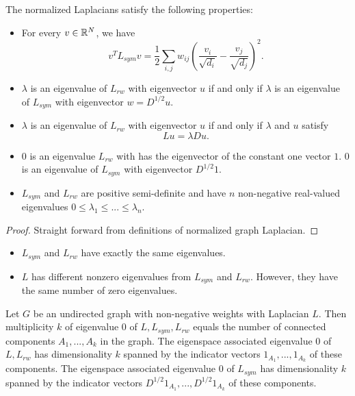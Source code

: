 \begin{refsection}
\begin{theorem}\label{ch:linearalgebra:th:spectrumnormalizedgraphLaplacian}
	The normalized Laplacians satisfy the following properties:
	\begin{itemize}
		\item For every $v\in \mathbb{R}^N$, we have
		$$v^TL_{sym}v = \frac{1}{2}\sum_{i,j} w_{ij}(\frac{v_i}{\sqrt{d_i}}-\frac{v_j}{\sqrt{d_j}})^2.$$
		\item $\lambda$ is an eigenvalue of $L_{rw}$ with eigenvector $u$ if and only if $\lambda$ is an eigenvalue of $L_{sym}$ with eigenvector $w = D^{1/2}u$.
		\item $\lambda$ is an eigenvalue of $L_{rw}$ with eigenvector $u$ if and only if $\lambda$ and $u$ satisfy $$Lu = \lambda Du.$$
		\item 0 is an eigenvalue $L_{rw}$ with has the eigenvector of the constant one vector $1$. 0 is an eigenvalue of $L_{sym}$ with eigenvector $D^{1/2}1$.
		\item $L_{sym}$ and $L_{rw}$ are positive semi-definite and have $n$ non-negative real-valued eigenvalues $0\leq \lambda_1\leq...\leq \lambda_n.$
	\end{itemize}
\end{theorem}
\begin{proof}
	Straight forward from definitions of normalized graph Laplacian.
\end{proof}
\begin{remark}\hfill
	\begin{itemize}
		\item $L_{sym}$ and $L_{rw}$ have exactly the same eigenvalues.
		\item $L$ has different nonzero eigenvalues from $L_{sym}$ and $L_{rw}$. However, they have the same number of zero eigenvalues.
	\end{itemize}	
\end{remark}


\begin{corollary}\cite{von2007tutorial}
	Let $G$ be an undirected graph with non-negative weights with Laplacian $L$. Then multiplicity $k$ of eigenvalue 0 of $L,L_{sym},L_{rw}$ equals the number of connected components $A_1,...,A_k$ in the graph. The eigenspace associated eigenvalue 0 of $L,L_{rw}$ has dimensionality $k$ spanned by the indicator vectors $1_{A_1},...,1_{A_k}$ of these components. The eigenspace associated eigenvalue 0 of $L_{sym}$ has dimensionality $k$ spanned by the indicator vectors $D^{1/2}1_{A_1},...,D^{1/2}1_{A_k}$ of these components.   
\end{corollary}




\end{refsection}
